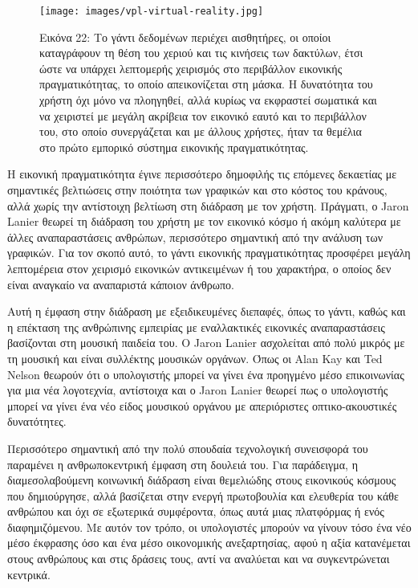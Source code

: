\documentclass[
]{article}
\begin{document}
\leavevmode{}%
\begin{figure}
\hypertarget{fig:vpl-virtual-reality}{%
\centering
\texttt{[image: images/vpl-virtual-reality.jpg]}
\caption{Εικόνα 22: Το γάντι δεδομένων περιέχει αισθητήρες, οι οποίοι
καταγράφουν τη θέση του χεριού και τις κινήσεις των δακτύλων, έτσι ώστε
να υπάρχει λεπτομερής χειρισμός στο περιβάλλον εικονικής
πραγματικότητας, το οποίο απεικονίζεται στη μάσκα. Η δυνατότητα του
χρήστη όχι μόνο να πλοηγηθεί, αλλά κυρίως να εκφραστεί σωματικά και να
χειριστεί με μεγάλη ακρίβεια τον εικονικό εαυτό και το περιβάλλον του,
στο οποίο συνεργάζεται και με άλλους χρήστες, ήταν τα θεμέλια στο πρώτο
εμπορικό σύστημα εικονικής
πραγματικότητας.}\label{fig:vpl-virtual-reality}
}
\end{figure}

Η εικονική πραγματικότητα έγινε περισσότερο δημοφιλής τις επόμενες
δεκαετίας με σημαντικές βελτιώσεις στην ποιότητα των γραφικών και στο
κόστος του κράνους, αλλά χωρίς την αντίστοιχη βελτίωση στη διάδραση με
τον χρήστη. Πράγματι, ο Jaron Lanier θεωρεί τη διάδραση του χρήστη με
τον εικονικό κόσμο ή ακόμη καλύτερα με άλλες αναπαραστάσεις ανθρώπων,
περισσότερο σημαντική από την ανάλυση των γραφικών. Για τον σκοπό αυτό,
το γάντι εικονικής πραγματικότητας προσφέρει μεγάλη λεπτομέρεια στον
χειρισμό εικονικών αντικειμένων ή του χαρακτήρα, ο οποίος δεν είναι
αναγκαίο να αναπαριστά κάποιον άνθρωπο.

Αυτή η έμφαση στην διάδραση με εξειδικευμένες διεπαφές, όπως το γάντι,
καθώς και η επέκταση της ανθρώπινης εμπειρίας με εναλλακτικές εικονικές
αναπαραστάσεις βασίζονται στη μουσική παιδεία του. O Jaron Lanier
ασχολείται από πολύ μικρός με τη μουσική και είναι συλλέκτης μουσικών
οργάνων. Όπως οι Alan Kay και Ted Nelson θεωρούν ότι ο υπολογιστής
μπορεί να γίνει ένα προηγμένο μέσο επικοινωνίας για μια νέα λογοτεχνία,
αντίστοιχα και ο Jaron Lanier θεωρεί πως ο υπολογιστής μπορεί να γίνει
ένα νέο είδος μουσικού οργάνου με απεριόριστες οπτικο-ακουστικές
δυνατότητες.

Περισσότερο σημαντική από την πολύ σπουδαία τεχνολογική συνεισφορά του
παραμένει η ανθρωποκεντρική έμφαση στη δουλειά του. Για παράδειγμα, η
διαμεσολαβούμενη κοινωνική διάδραση είναι θεμελιώδης στους εικονικούς
κόσμους που δημιούργησε, αλλά βασίζεται στην ενεργή πρωτοβουλία και
ελευθερία του κάθε ανθρώπου και όχι σε εξωτερικά συμφέροντα, όπως αυτά
μιας πλατφόρμας ή ενός διαφημιζόμενου. Με αυτόν τον τρόπο, οι
υπολογιστές μπορούν να γίνουν τόσο ένα νέο μέσο έκφρασης όσο και ένα
μέσο οικονομικής ανεξαρτησίας, αφού η αξία κατανέμεται στους ανθρώπους
και στις δράσεις τους, αντί να αναλύεται και να συγκεντρώνεται κεντρικά.
\end{document}
